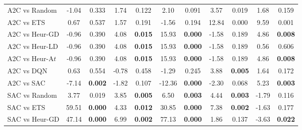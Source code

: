 \begin{tabular}{lcccccccccc}
	\midrule 
	A2C vs Random    & -1.04         & 0.333                  & 1.74          & 0.122                  & 2.10           & 0.091                 & 3.57          & 0.019                  & 1.68           & 0.159                 \\
	A2C vs ETS       & 0.67          & 0.537                  & 1.57          & 0.191                  & -1.56          & 0.194                 & 12.84         & 0.000                  & 9.59           & 0.001                 \\
	A2C vs Heur-GD   & -0.96         & 0.390                  & 4.08          & \textbf{0.015}         & 15.93          & \textbf{0.000}        & -1.58         & 0.189                  & 4.86           & \textbf{0.008}        \\
	A2C vs Heur-LD   & -0.96         & 0.390                  & 4.08          & \textbf{0.015}         & 15.93          & \textbf{0.000}        & -1.58         & 0.189                  & 0.56           & 0.606                 \\
	A2C vs Heur-A$t$ & -0.96         & 0.390                  & 4.08          & \textbf{0.015}         & 15.93          & \textbf{0.000}        & -1.58         & 0.189                  & 4.86           & \textbf{0.008}        \\
	A2C vs DQN       & 0.63          & 0.554                  & -0.78         & 0.458                  & -1.29          & 0.245                 & 3.88          & \textbf{0.005}         & 1.64           & 0.172                 \\
	A2C vs SAC       & -7.14         & \textbf{0.002}         & -1.82         & 0.107                  & -12.36         & \textbf{0.000}        & -2.30         & 0.068                  & 5.23           & \textbf{0.003}        \\
	\midrule 
	SAC vs Random    & 3.77          & 0.019                  & 3.85          & \textbf{0.005}         & 6.50           & \textbf{0.003}        & 4.44          & \textbf{0.003}         & -1.79          & 0.116                 \\
	SAC vs ETS       & 59.51         & \textbf{0.000}         & 4.33          & \textbf{0.012}         & 30.85          & \textbf{0.000}        & 7.38          & \textbf{0.002}         & -1.63          & 0.177                 \\
	SAC vs Heur-GD   & 47.14         & \textbf{0.000}         & 6.99          & \textbf{0.002}         & 77.13          & \textbf{0.000}        & 1.86          & 0.137                  & -3.63          & \textbf{0.022}        \\

\end{tabular}
